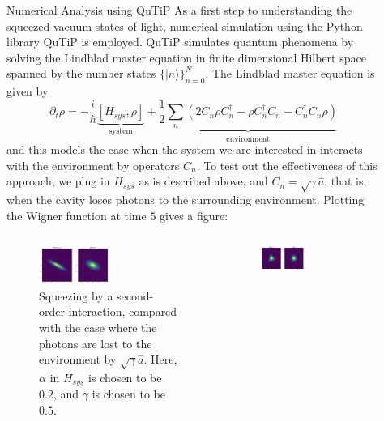\documentclass[final]{beamer}
\newcommand*\ket[1]{|{#1}\rangle}
\newlength{\sepwidth}
\newlength{\colwidth}
\newcommand{\separatorcolumn}{\begin{column}{\sepwidth}\end{column}}
\begin{document}
\begin{frame}[t]
\begin{columns}[t]
\begin{column}{\colwidth}
    \end{column}

    \separatorcolumn

    \begin{column}{\colwidth}
      \begin{block}{Numerical Analysis using QuTiP}
        As a first step to understanding the squeezed vacuum states of light, numerical simulation using the Python library QuTiP is employed.
        QuTiP simulates quantum phenomena by solving the Lindblad master equation in finite dimensional Hilbert space spanned by the number states $\{\ket{n}\}_{n=0}^{N}$.
        The Lindblad master equation is given by
        \[\partial_{t}\rho=-\frac{i}{\hbar}\underbrace{[H_{sys},\rho]}_{\text{system}}+\underbrace{\frac{1}{2}\sum_{n}(2C_{n}\rho C_{n}^{\dag}-\rho C_{n}^{\dag}C_{n}-C_{n}^{\dag} C_{n}\rho)}_{\text{environment}}\]
        and this models the case when the system we are interested in interacts with the environment by operators $C_{n}$.
        To test out the effectiveness of this approach, we plug in $H_{sys}$ as is described above, and $C_{n}=\sqrt{\gamma}\hat{a}$, that is, when the cavity loses photons to the surrounding environment.
        Plotting the Wigner function at time $5$ gives a figure:
        \begin{columns}
          \begin{column}{0.5\textwidth}
            \begin{figure}
              \includegraphics[width=0.5\textwidth]{squeezed_decay_0.5.png}
              \caption{Squeezing by a second-order interaction, compared with the case where the photons are lost to the environment by $\sqrt{\gamma}\hat{a}$. Here, $\alpha$ in $H_{sys}$ is chosen to be $0.2$, and $\gamma$ is chosen to be $0.5$.}
            \end{figure}
          \end{column}
          \begin{column}{0.5\textwidth}
            \begin{figure}
              \includegraphics[width=0.5\textwidth]{third_decay_0.5.png}

\end{figure}
\end{column}
\end{columns}
\end{block}
\end{column}
\end{columns}
\end{frame}
\end{document}

